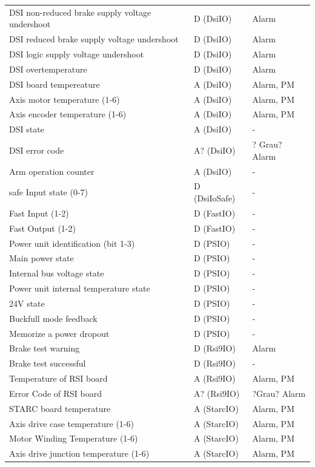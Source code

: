 \documentclass[ a4paper,
                oneside,
                toc=bibliography,
                toc=listof
                ]{scrbook}
\begin{document}
\begin{longtable}{|p{7cm}|p{3cm}|p{3cm}|}
		DSI non-reduced brake supply voltage undershoot & D (DsiIO) & Alarm \\
		DSI reduced brake supply voltage undershoot & D (DsiIO) & Alarm \\
		DSI logic supply voltage undershoot & D (DsiIO) & Alarm \\
		DSI overtemperature & D (DsiIO) & Alarm \\
		\hline
		DSI board tempereature & A (DsiIO) & Alarm, PM \\
		Axis motor temperature (1-6) & A (DsiIO) & Alarm, PM \\
		Axis encoder temperature (1-6) & A (DsiIO) & Alarm, PM \\
		DSI state & A (DsiIO) & - \\
		DSI error code & A? (DsiIO) & ? Grau? Alarm \\
		Arm operation counter & A (DsiIO) & - \\
		\hline
		safe Input state (0-7) & D (DsiIoSafe) & - \\
		\hline
		Fast Input (1-2) & D (FastIO) & - \\
		Fast Output (1-2) & D (FastIO) & - \\
		\hline
		Power unit identification (bit 1-3) & D (PSIO) & - \\
		Main power state & D (PSIO) & - \\
		Internal bus voltage state & D (PSIO) & - \\
		Power unit internal temperature state & D (PSIO) & - \\
		24V state & D (PSIO) & - \\
		Buckfull mode feedback & D (PSIO) & - \\
		Memorize a power dropout & D (PSIO) & - \\
		\hline
		Brake test warning & D (Rsi9IO) & Alarm \\
		Brake test successful & D (Rsi9IO) & - \\
		Temperature of RSI board & A (Rsi9IO) & Alarm, PM \\
		Error Code of RSI board & A? (Rsi9IO) & ?Grau? Alarm \\
		\hline
		STARC board temperature & A (StarcIO) & Alarm, PM \\
		Axis drive case temperature (1-6) & A (StarcIO) & Alarm, PM \\
		Motor Winding Temperature (1-6) & A (StarcIO) & Alarm, PM \\
		Axis drive junction temperature (1-6) & A (StarcIO) & Alarm, PM \\		

\end{longtable}
\end{document}
